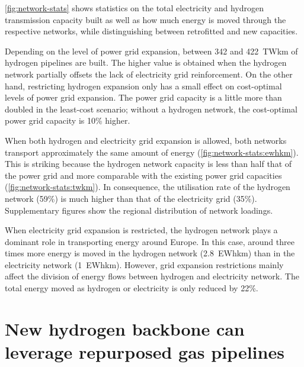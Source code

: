 \cref{fig:network-stats} shows statistics on the total electricity and hydrogen
transmission capacity built as well as how much energy is moved through the
respective networks, while distinguishing between retrofitted and new
capacities.


Depending on the level of power grid expansion, between 342 and 422~TWkm of
hydrogen pipelines are built. The higher value is obtained when the hydrogen
network partially offsets the lack of electricity grid reinforcement. On the
other hand, restricting hydrogen expansion only has a small effect on
cost-optimal levels of power grid expansion. The power grid capacity is a little
more than doubled in the least-cost scenario; without a hydrogen network, the
cost-optimal power grid capacity is 10\% higher.


When both hydrogen and electricity grid expansion is allowed, both networks
transport approximately the same amount of energy
(\cref{fig:network-stats:ewhkm}). This is striking because the hydrogen network
capacity is less than half that of the power grid and more comparable with the
existing power grid capacities (\cref{fig:network-stats:twkm}). In consequence,
the utilisation rate of the hydrogen network (59\%) is much higher than that of
the electricity grid (35\%). Supplementary figures show the regional
distribution of network loadings.


When electricity grid expansion is restricted, the hydrogen network plays a
dominant role in transporting energy around Europe. In this case, around three
times more energy is moved in the hydrogen network (2.8~EWhkm) than in the
electricity network (1~EWhkm). However, grid expansion restrictions mainly
affect the division of energy flows between hydrogen and electricity network.
The total energy moved as hydrogen or electricity is only reduced by 22\%.

\section*{New hydrogen backbone can leverage repurposed gas pipelines}
\label{sec:repurposed}


